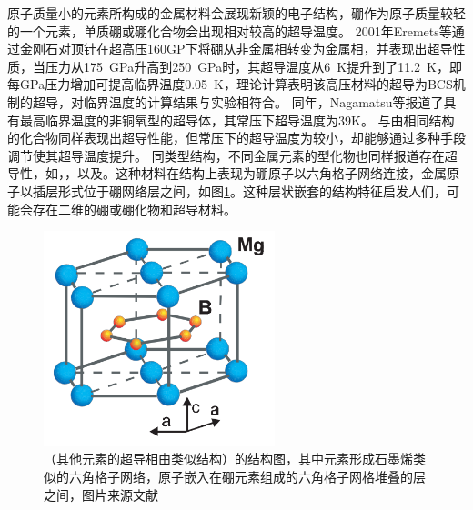 原子质量小的元素所构成的金属材料会展现新颖的电子结构，硼作为原子质量较轻的一个元素，单质硼或硼化合物会出现相对较高的超导温度。
2001年Eremets等\cite{eremets2001superconductivity}通过金刚石对顶针在超高压160GP下将硼从非金属相转变为金属相，并表现出超导性质，当压力从\SI{175}{\GPa}升高到\SI{250}{\GPa}时，其超导温度从\SI{6}{\kelvin}提升到了\SI{11.2}{\kelvin}，即每\si{\GPa}压力增加可提高临界温度\SI{0.05}{\kelvin}，理论计算表明该高压材料的超导为BCS机制的超导，对临界温度的计算结果与实验相符合。
同年，Nagamatsu等\cite{nagamatsu2001superconductivity}报道了具有最高临界温度的非铜氧型的超导体\cite{buzea2001review}，其常压下超导温度为39K。
与由相同结构的化合物同样表现出超导性能，但常压下的超导温度为较小，却能够通过多种手段调节使其超导温度提升。
同类型结构，不同金属元素的型化物也同样报道存在超导性，如，\cite{barbero2017doping}，\cite{mudgel2008superconductivity}以及\cite{singh2001superconductivity}。这种材料在结构上表现为硼原子以六角格子网络连接，金属原子以插层形式位于硼网络层之间，如图\ref{fig:ch1_mgb2}。这种层状嵌套的结构特征启发人们，可能会存在二维的硼或硼化物和超导材料。

\begin{figure}
  \includegraphics[width=0.60\textwidth]{figs/ch1_mgb2.png}
  \centering
  \caption{（其他元素的超导相由类似结构）的结构图，其中元素形成石墨烯类似的六角格子网络，原子嵌入在硼元素组成的六角格子网格堆叠的层之间，图片来源文献\cite{buzea2001review}}
  \label{fig:ch1_mgb2}
\end{figure}

